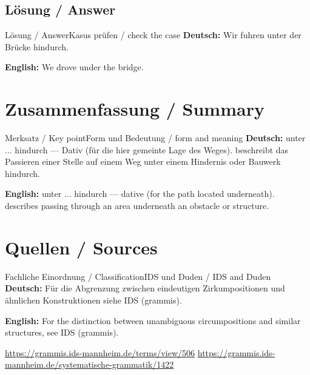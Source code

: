 \documentclass[a4paper,11pt]{article}
\newcommand{\GermanText}[1]{\textbf{Deutsch: }#1\par}
\newcommand{\EnglishText}[1]{{\small\color{SoftGray}\textbf{English: }#1\par}}
\begin{document}
\subsection{Lösung / Answer}
\begin{grammarentry}{Lösung / Answer}{Kasus prüfen / check the case}
\GermanText{Wir fuhren unter der Brücke hindurch.}
\EnglishText{We drove under the bridge.}
\end{grammarentry}
\section{Zusammenfassung / Summary}
\begin{grammarentry}{Merksatz / Key point}{Form und Bedeutung / form and meaning}
\GermanText{unter ... hindurch — Dativ (für die hier gemeinte Lage des Weges). beschreibt das Passieren einer Stelle auf einem Weg unter einem Hindernis oder Bauwerk hindurch.}
\EnglishText{unter ... hindurch — dative (for the path located underneath). describes passing through an area underneath an obstacle or structure.}
\end{grammarentry}
\section{Quellen / Sources}
\begin{grammarentry}{Fachliche Einordnung / Classification}{IDS und Duden / IDS and Duden}
\GermanText{Für die Abgrenzung zwischen eindeutigen Zirkumpositionen und ähnlichen Konstruktionen siehe IDS (grammis).}
\EnglishText{For the distinction between unambiguous circumpositions and similar structures, see IDS (grammis).}
\url{https://grammis.ids-mannheim.de/terms/view/506}
\url{https://grammis.ids-mannheim.de/systematische-grammatik/1422}
\end{grammarentry}
\end{document}
